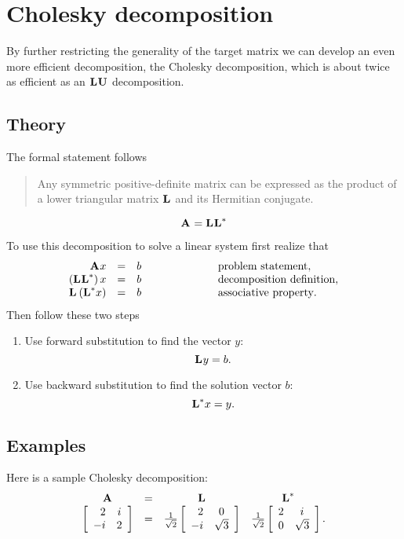 \section[$\A{}=\LL{}\LL{*}$]{Cholesky decomposition}
By further restricting the generality of the target matrix we can develop an even more efficient decomposition, the Cholesky decomposition, which is about twice as efficient as an $\LL{}\U{}$ decomposition.

\subsection{Theory}
The formal statement follows
\begin{quote}
Any symmetric positive-definite matrix can be expressed as the product of a lower triangular matrix $\LL{}$ and its Hermitian conjugate.
\end{quote}
\begin{equation}
  \A{}=\LL{}\LL{*}
\end{equation}

To use this decomposition to solve a linear system first realize that
\begin{equation}
\begin{array}{rcll}
  \A{}x&=&b \qquad\qquad\qquad &\text{problem statement},\\
  \paren{\LL{}\LL{*}}x&=&b \qquad\qquad\qquad &\text{decomposition definition},\\
  \LL{}\paren{\LL{*}x}&=&b \qquad\qquad\qquad &\text{associative property}.\\
\end{array}
\end{equation}
Then follow these two steps
\begin{enumerate}
\item Use forward substitution to find the vector $y$:
\begin{equation}
  \LL{}y = b.
  \label{eq:decomp:LL1}
\end{equation}
\item Use backward substitution to find the solution vector $b$:
\begin{equation}
  \LL{*}x = y.
  \label{eq:decomp:LL2}
\end{equation}
\end{enumerate}

\subsection{Examples}
Here is a sample Cholesky decomposition:
\begin{equation}
  \begin{array}{cccc}
    \A{}&=&\LL{}&\LL{*}\\
  \left[
\begin{array}{rc}
 2 & i \\
 -i & 2
\end{array}
\right]
&=&
\frac{1}{\sqrt{2}}\mat{rc}
{
 2 & 0 \\
 -i & \sqrt{3}
}
&\frac{1}{\sqrt{2}}
\mat{rc}
{
 2 & i \\
 0 & \sqrt{3}
}.
  \end{array}
\end{equation}

